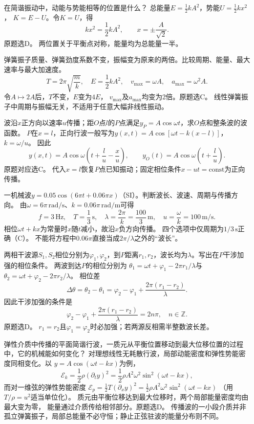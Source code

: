\problemtext 在简谐振动中，动能与势能相等的位置是什么？
\workings
总能量$E=\frac12kA^2$，势能$U=\frac12kx^2$，
$K=E-U$。令$K=U$，得
\[
kx^2=\frac12kA^2,\qquad
\boxed{x=\pm\frac{A}{\sqrt2}}.
\]
原题选D。
\crosscheck 两位置关于平衡点对称，能量均为总能量一半。

\problemtext 弹簧振子质量、弹簧劲度系数不变，振幅变为原来的两倍。比较周期、能量、最大速率与最大加速度。
\workings
\[
T=2\pi\sqrt{\frac mk},\quad
E=\frac12kA^2,\quad
v_{\max}=\omega A,\quad
a_{\max}=\omega^2 A.
\]
令$A\mapsto2A$后，$T$不变，$E$变为$4E$，
$v_{\max}$及$a_{\max}$均变为2倍。原题选C。
\crosscheck 线性弹簧振子中周期与振幅无关，不适用于任意大幅非线性振动。

\problemtext 波沿$x$正方向以速率$u$传播；距$O$点$l$的$P$点满足$y_P=A\cos\omega t$，求$O$点和整条波的波函数。
\workings
$P$在$x=l$，正向行波一般写为$y(x,t)=A\cos[\omega t-k(x-l)]$，$k=\omega/u$。
因此
\[
\boxed{y(x,t)=A\cos\omega\left(t+\frac lu-\frac xu\right)},\qquad
\boxed{y_O(t)=A\cos\omega\left(t+\frac lu\right)}.
\]
原题对应选C。
\crosscheck 代入$x=l$恢复$P$点已知振动；固定相位条件$x-ut=\mathrm{const}$为正向传播。

\problemtext 一机械波$y=0.05\cos(6\pi t+0.06\pi x)$（SI）。判断波长、波速、周期与传播方向。
\workings
由$\omega=6\pi\,\mathrm{rad/s}$、$k=0.06\pi\,\mathrm{rad/m}$可得
\[
f=3\,\mathrm{Hz},\quad
\boxed{T=\frac13\,\mathrm s},\quad
\lambda=\frac{2\pi}{k}=\frac{100}{3}\,\mathrm m,\quad
u=\frac{\omega}{k}=100\,\mathrm{m/s}.
\]
相位$\omega t+kx$为常量时$x$随$t$减小，故沿$x$负方向传播。
四个选项中仅周期为$1/3\,\mathrm s$正确（C）。
\crosscheck 不能将方程中$0.06\pi$直接当成$2\pi/\lambda$之外的“波长”。

\problemtext 两相干波源$S_1,S_2$相位分别为$\varphi_1,\varphi_2$，到$P$距离$r_1,r_2$，波长均为$\lambda$。写出在$P$干涉加强的相位条件。
\workings
两波到达$P$的相位分别为
$\theta_1=\omega t+\varphi_1-2\pi r_1/\lambda$与
$\theta_2=\omega t+\varphi_2-2\pi r_2/\lambda$。
相位差
\[
\Delta\theta=\theta_2-\theta_1
=\varphi_2-\varphi_1+\frac{2\pi(r_1-r_2)}{\lambda}.
\]
因此干涉加强的条件是
\[
\boxed{\varphi_2-\varphi_1+\frac{2\pi(r_1-r_2)}{\lambda}=2n\pi},
\quad n\in\mathbb Z.
\]
原题选D。
\crosscheck $r_1=r_2$且$\varphi_1=\varphi_2$时必加强；若两源反相需半整数波长差。

\problemtext 弹性介质中传播的平面简谐行波，一质元从平衡位置移动到最大位移位置的过程中，它的机械能如何变化？
\workings
对理想线性无耗散行波，局部动能密度和弹性势能密度同相变化。以
$y=A\cos(\omega t-kx)$为例，
\[
\mathcal E_k=\frac12\rho(\partial_t y)^2
=\frac12\rho A^2\omega^2\sin^2(\omega t-kx),
\]
而对一维弦的弹性势能密度
$\mathcal E_p=\frac12T(\partial_x y)^2
=\frac12\rho A^2\omega^2\sin^2(\omega t-kx)$
（用$T/\rho=u^2$适当单位化）。
质元由平衡位移达到最大位移时，两个局部能量密度均由最大变为零，
能量通过介质传给相邻部分。原题选D。
\crosscheck 传播波的一小段介质并非孤立弹簧振子，局部总能量不必守恒；静止正弦驻波的能量分布则不同。
